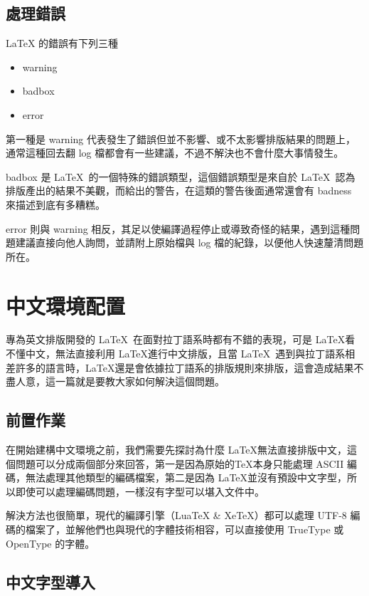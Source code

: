 \section{處理錯誤}

LaTeX 的錯誤有下列三種

\begin{itemize}
\item warning
\item badbox
\item error
\end{itemize}

第一種是 warning 代表發生了錯誤但並不影響、或不太影響排版結果的問題上，通常這種回去翻 log 檔都會有一些建議，不過不解決也不會什麼大事情發生。

badbox 是 \LaTeX\ 的一個特殊的錯誤類型，這個錯誤類型是來自於 \LaTeX\ 認為排版產出的結果不美觀，而給出的警告，在這類的警告後面通常還會有 badness 來描述到底有多糟糕。

error 則與 warning 相反，其足以使編譯過程停止或導致奇怪的結果，遇到這種問題建議直接向他人詢問，並請附上原始檔與 log 檔的紀錄，以便他人快速釐清問題所在。

\chapter{中文環境配置}

專為英文排版開發的 \LaTeX\ 在面對拉丁語系時都有不錯的表現，可是 \LaTeX 看不懂中文，無法直接利用 \LaTeX 進行中文排版，且當 \LaTeX\ 遇到與拉丁語系相差許多的語言時，\LaTeX 還是會依據拉丁語系的排版規則來排版，這會造成結果不盡人意，這一篇就是要教大家如何解決這個問題。

\section{前置作業}

在開始建構中文環境之前，我們需要先探討為什麼 \LaTeX 無法直接排版中文，這個問題可以分成兩個部分來回答，第一是因為原始的\TeX 本身只能處理 ASCII 編碼，無法處理其他類型的編碼檔案，第二是因為 \LaTeX 並沒有預設中文字型，所以即使可以處理編碼問題，一樣沒有字型可以堪入文件中。

解決方法也很簡單，現代的編譯引擎（LuaTeX \& XeTeX）都可以處理 UTF-8 編碼的檔案了，並解他們也與現代的字體技術相容，可以直接使用 TrueType 或 OpenType 的字體。

\section{中文字型導入}

